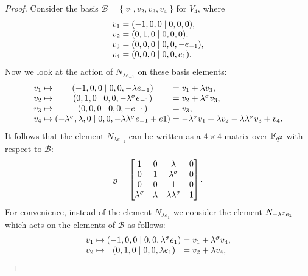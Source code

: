 \begin{proof}
	Consider the basis $\mathcal{B} = \{\ v_1, v_2, v_3, v_4\ \}$ for $V_4$, where
	\begin{equation*}
		\begin{array}{r@{\;}c@{\;}l}
			v_1 & = & (-1,0,0\mid 0,0,0), \\
			v_2 & = & (0,1,0\mid 0,0,0), \\
			v_3 & = & (0,0,0\mid 0,0,-e_{-1}), \\
			v_4 & = & (0,0,0\mid 0,0,e_1).
		\end{array}
	\end{equation*}
	Now we look at the action of $N_{\lambda e_{-1}}$ on these basis elements:
	\begin{equation*}
		\begin{array}{r@{\;}c@{\;}c@{\;}c@{\;}l}
			v_1 & \mapsto & (-1,0,0\mid 0,0,-\lambda e_{-1}) & = & v_1 + \lambda v_3, \\
			v_2 & \mapsto & (0,1,0\mid 0,0,-\lambda^{\s} e_{-1}) & = & v_2 + \lambda^{\s} v_3, \\
			v_3 & \mapsto & (0,0,0\mid 0,0,-e_{-1}) & = & v_3, \\
			v_4 & \mapsto & (-\lambda^{\s}, \lambda, 0 \mid 0,0,-\lambda \lambda^{\s} 
									e_{-1} + e1) & = & 
							-\lambda^{\s} v_1 + \lambda v_2 - \lambda \lambda^{\s} v_3 + v_4.
		\end{array}
	\end{equation*}
	It follows that the element $N_{\lambda e_{-1}}$ can be written as a $4\times 4$ 
	matrix over $\mathbb{F}_{q^2}$ with respect to $\mathcal{B}$:
	\begin{equation*}
		[N_{\lambda e_{-1}}]_{\mathcal{B}} = \begin{bmatrix}
			1 & 0 & \lambda & 0 \\
			0 & 1 & \lambda^{\s} & 0 \\
			0 & 0 & 1 & 0 \\
			\lambda^{\s} & \lambda & \lambda \lambda^{\s} & 1
		\end{bmatrix}.
	\end{equation*}
	For convenience, instead of the element $N_{\lambda e_1}$ we consider the element
	$N_{-\lambda^{\sigma} e_1}$ which acts on the elements of $\mathcal{B}$ as follows:
	\begin{equation*}
		\begin{array}{r@{\;}c@{\;}c@{\;}c@{\;}l}
			v_1 & \mapsto & (-1,0,0\mid 0,0, \lambda^{\s} e_1) & = & v_1 + \lambda^{\s} v_4, \\
			v_2 & \mapsto & (0,1,0\mid 0,0, \lambda e_1) & = & v_2 + \lambda v_4, \\

\end{array}
\end{equation*}
\end{proof}
